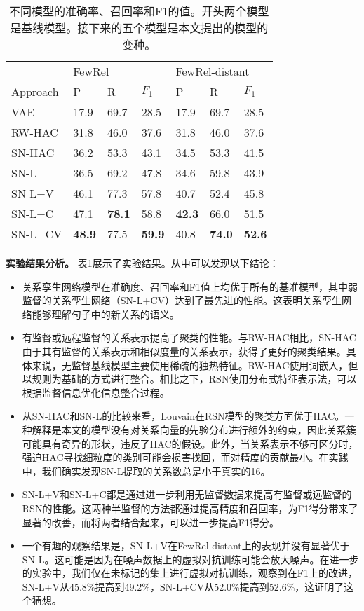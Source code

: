 \begin{translation}
\begin{table}[]
\centering
\begin{tabular}{lllllll}
\toprule
         & \multicolumn{3}{l}{FewRel} & \multicolumn{3}{l}{FewRel-distant} \\
Approach & P     & R     & $F_1$   & P        & R       & $F_1$      \\ \midrule
VAE      & 17.9  & 69.7  &  28.5   &  17.9    & 69.7    &  28.5      \\
RW-HAC   & 31.8  & 46.0  &  37.6   &  31.8    & 46.0    &  37.6      \\ \midrule
SN-HAC   & 36.2  & 53.3  &  43.1   &  34.5    & 53.3    &  41.5      \\
SN-L     & 36.5  & 69.2  &  47.8   &  34.6    & 59.8    &  43.9      \\
SN-L+V   & 46.1  & 77.3  &  57.8   &  40.7    & 52.4    &  45.8      \\
SN-L+C   & 47.1  & \textbf{78.1}  &  58.8   &  \textbf{42.3}    & 66.0    & 51.5       \\
SN-L+CV  & \textbf{48.9}  &   77.5  & \textbf{59.9}  &  40.8   & \textbf{74.0} & \textbf{52.6}           \\ \bottomrule
\end{tabular}
\caption{不同模型的准确率、召回率和F1的值。开头两个模型是基线模型。接下来的五个模型是本文提出的模型的变种。}
\label{appendix:openre:result}
\end{table}

\textbf{实验结果分析。} 表\ref{appendix:openre:result}展示了实验结果。从中可以发现以下结论：
\begin{itemize}
	\item 关系孪生网络模型在准确度、召回率和F1值上均优于所有的基准模型，其中弱监督的关系孪生网络（SN-L+CV）达到了最先进的性能。这表明关系孪生网络能够理解句子中的新关系的语义。
	\item 有监督或远程监督的关系表示提高了聚类的性能。与RW-HAC相比，SN-HAC由于其有监督的关系表示和相似度量的关系表示，获得了更好的聚类结果。具体来说，无监督基线模型主要使用稀疏的独热特征。RW-HAC使用词嵌入，但以规则为基础的方式进行整合。相比之下，RSN使用分布式特征表示法，可以根据监督信息优化信息整合过程。
	\item 从SN-HAC和SN-L的比较来看，Louvain在RSN模型的聚类方面优于HAC。一种解释是本文的模型没有对关系向量的先验分布进行额外的约束，因此关系簇可能具有奇异的形状，违反了HAC的假设。此外，当关系表示不够可区分时，强迫HAC寻找细粒度的类别可能会损害找回，而对精度的贡献最小。在实践中，我们确实发现SN-L提取的关系数总是小于真实的16。
	\item SN-L+V和SN-L+C都是通过进一步利用无监督数据来提高有监督或远监督的RSN的性能。这两种半监督的方法都通过提高精度和召回率，为F1得分带来了显著的改善，而将两者结合起来，可以进一步提高F1得分。
	\item 一个有趣的观察结果是，SN-L+V在FewRel-distant上的表现并没有显著优于SN-L。这可能是因为在噪声数据上的虚拟对抗训练可能会放大噪声。在进一步的实验中，我们仅在未标记的集上进行虚拟对抗训练，观察到在F1上的改进，SN-L+V从45.8\%提高到49.2\%，SN-L+CV从52.0\%提高到52.6\%，这证明了这个猜想。
\end{itemize}



\end{translation}
